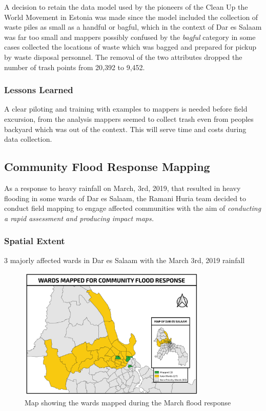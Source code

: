 \documentclass[a4paper,12pt,twoside]{article}
\begin{document}
A decision to retain the data model used by the pioneers of the Clean Up the World Movement in Estonia was made since the model included the collection of waste piles as small as a handful or bagful, which in the context of Dar es Salaam was far too small and mappers possibly confused by the \textit{bagful} category in some cases collected the locations of waste which was bagged and prepared for pickup by waste disposal personnel. The removal of the two attributes dropped the number of trash points from 20,392 to 9,452.


\subsubsection{Lessons Learned}
A clear piloting and training with examples to mappers is needed before field excursion, from the analysis mappers seemed to collect trash even from peoples backyard which was out of the context. This will serve time and costs during data collection.
\newpage
\subsection{Community Flood Response Mapping}
As a response to heavy rainfall on March, 3rd, 2019, that resulted in heavy flooding in some wards of Dar es Salaam, the Ramani Huria team decided to conduct field mapping to engage affected communities with the aim of \textit{conducting a rapid assessment and producing impact maps.}

\subsubsection{Spatial Extent}
3 majorly affected wards in Dar es Salaam with the March 3rd, 2019 rainfall

\begin{figure}[h]
  \color{RHgreen}\caption{Map showing the wards mapped during the March flood response}
  \centering
  \includegraphics[width=0.8\textwidth]{images/flood_response.png}
\end{figure}
\end{document}
